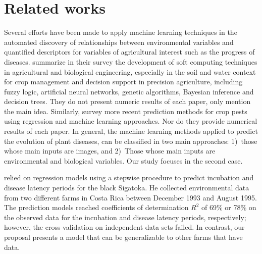 \section{Related works}
\label{sec:related}

Several efforts have been made to apply machine learning techniques in
the automated discovery of relationships between environmental
variables and quantified descriptors for variables of agricultural 
interest such as the progress of diseases.
% 
\citet{Huang2010} summarize in their survey the
development of soft computing techniques in agricultural and
biological engineering, especially in the soil and water context for crop management and decision support in precision agriculture, including fuzzy logic, artificial neural
networks, genetic algorithms, Bayesian inference and decision trees. They do not present numeric results of each paper, only mention the main idea.
%
Similarly, \citet{Kim2014} survey more recent prediction
methods for crop pests using regression and machine learning approaches. Nor do they provide numerical results of each paper.
%
In general, the machine learning methods applied to predict the
evolution of plant diseases, can be classified in two main approaches: 
1)~those whose main inputs are images, and 2)~Those whose main inputs
are environmental and biological variables. Our study focuses in the
second case.
%



% 
%
%

\citet{Romero1995} relied on regression models using a stepwise
procedure to predict incubation and disease latency periods for the
black Sigatoka.
% 
He collected environmental data from two different farms in Costa Rica
between December 1993 and August 1995.
%
The prediction models reached coefficients of determination $R^2$ of
69\% or 78\% on the observed data for the incubation and disease
latency periods, respectively; however, the cross validation on
independent data sets failed.
%
In contrast, our proposal presents a model that can be generalizable to other farms that have data.

